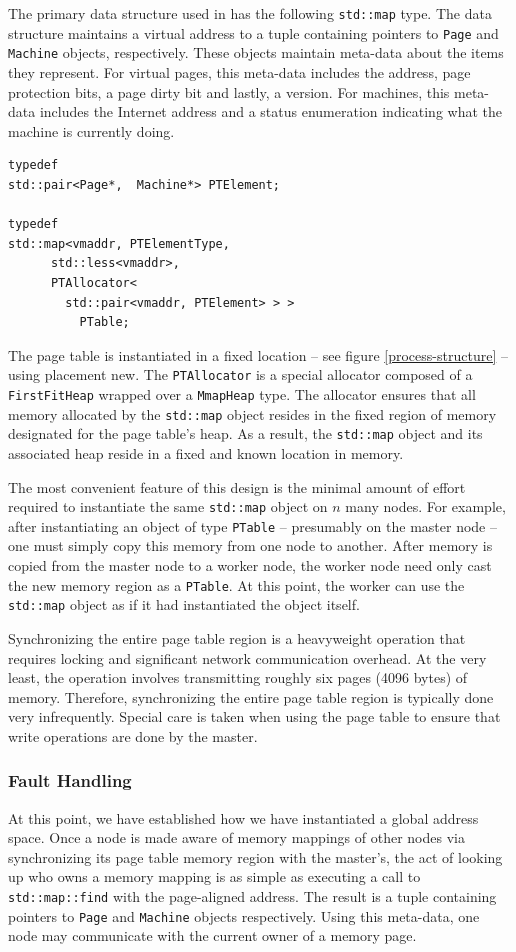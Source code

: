 The primary data structure used in \projname{} has the following \verb,std::map, type.  The data structure maintains a virtual address to a tuple containing pointers to \verb,Page, and \verb,Machine, objects, respectively.  These objects maintain meta-data about the items they represent.  For virtual pages, this meta-data includes the address, page protection bits, a page dirty bit and lastly, a version.  For machines, this meta-data includes the Internet address and a status enumeration indicating what the machine is currently doing.

\begin{verbatim}
typedef
std::pair<Page*,  Machine*> PTElement;

typedef
std::map<vmaddr, PTElementType,
      std::less<vmaddr>,
      PTAllocator<
        std::pair<vmaddr, PTElement> > >
          PTable;
\end{verbatim}

The \projname{} page table is instantiated in a fixed location -- see figure \ref{process-structure} -- using placement new.  The \verb,PTAllocator, is a special allocator composed of a \verb,FirstFitHeap, wrapped over a \verb,MmapHeap, type.  The allocator ensures that all memory allocated by the \verb,std::map, object resides in the fixed region of memory designated for the page table's heap.  As a result, the \verb,std::map, object and its associated heap reside in a fixed and known location in memory.

The most convenient feature of this design is the minimal amount of effort required to instantiate the same \verb,std::map, object on $n$ many nodes.  For example, after instantiating an object of type \verb,PTable, -- presumably on the master node -- one must simply copy this memory from one node to another.  After memory is copied from the master node to a worker node, the worker node need only cast the new memory region as a \verb,PTable,.  At this point, the worker can use the \verb,std::map, object as if it had instantiated the object itself.

Synchronizing the entire page table region is a heavyweight operation that requires locking and significant network communication overhead.  At the very least, the operation involves transmitting roughly six pages (4096 bytes) of memory.  Therefore, synchronizing the entire page table region is typically done very infrequently.  Special care is taken when using the page table to ensure that write operations are done by the master.


\subsubsection{Fault Handling}
At this point, we have established how we have instantiated a global address space.  Once a node is made aware of memory mappings of other nodes via synchronizing its page table memory region with the master's, the act of looking up who owns a memory mapping is as simple as executing a call to \verb,std::map::find, with the page-aligned address.  The result is a tuple containing pointers to \verb,Page, and \verb,Machine, objects respectively.  Using this meta-data, one node may communicate with the current owner of a memory page.

